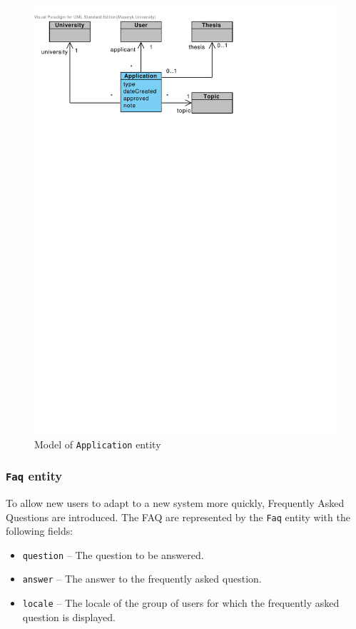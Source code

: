 \begin{figure}[h]
    \centering
        \includegraphics[trim=10 630 200 30, clip, keepaspectratio, width=\textwidth]{./images/domain-application-entity.pdf}
    \caption{Model of \texttt{Application} entity}
    \label{fig:domain-application-entity}
\end{figure}

\subsubsection{\texttt{Faq} entity}

To allow new users to adapt to a new system more quickly, Frequently Asked Questions are introduced. The FAQ are represented by the \texttt{Faq} entity with the following fields:

\begin{itemize}
    \item \texttt{question} -- The question to be answered.
    \item \texttt{answer} -- The answer to the frequently asked question.
    \item \texttt{locale} -- The locale of the group of users for which the frequently asked question is displayed.
\end{itemize}

